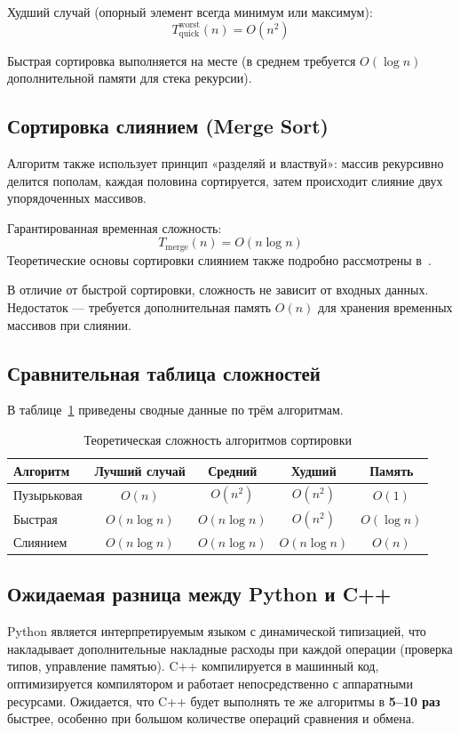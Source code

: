 Худший случай (опорный элемент всегда минимум или максимум):
\begin{equation}
    \label{eq:quick_worst}
    T_{\text{quick}}^{\text{worst}}(n) = O(n^2)
\end{equation}

Быстрая сортировка выполняется на месте (в среднем требуется $O(\log n)$ дополнительной памяти для стека рекурсии).

\subsection{Сортировка слиянием (Merge Sort)}

Алгоритм также использует принцип «разделяй и властвуй»: массив рекурсивно делится пополам, каждая половина сортируется, затем происходит слияние двух упорядоченных массивов.

Гарантированная временная сложность:
\begin{equation}
    \label{eq:merge}
    T_{\text{merge}}(n) = O(n \log n)
\end{equation}
Теоретические основы сортировки слиянием также подробно рассмотрены в~\cite{cormen2009}.

В отличие от быстрой сортировки, сложность не зависит от входных данных. Недостаток — требуется дополнительная память $O(n)$ для хранения временных массивов при слиянии.

\subsection{Сравнительная таблица сложностей}

В таблице~\ref{tab:complexity} приведены сводные данные по трём алгоритмам.

\begin{table}[H]
\centering
\caption{Теоретическая сложность алгоритмов сортировки}
\label{tab:complexity}
\begin{tabular}{|l|c|c|c|c|}
\hline
\textbf{Алгоритм} & \textbf{Лучший случай} & \textbf{Средний} & \textbf{Худший} & \textbf{Память} \\
\hline
Пузырьковая & $O(n)$ & $O(n^2)$ & $O(n^2)$ & $O(1)$ \\
\hline
Быстрая & $O(n \log n)$ & $O(n \log n)$ & $O(n^2)$ & $O(\log n)$ \\
\hline
Слиянием & $O(n \log n)$ & $O(n \log n)$ & $O(n \log n)$ & $O(n)$ \\
\hline
\end{tabular}
\end{table}

\subsection{Ожидаемая разница между Python и C++}

Python является интерпретируемым языком с динамической типизацией, что накладывает дополнительные накладные расходы при каждой операции (проверка типов, управление памятью). C++ компилируется в машинный код, оптимизируется компилятором и работает непосредственно с аппаратными ресурсами. Ожидается, что C++ будет выполнять те же алгоритмы в \textbf{5–10 раз} быстрее, особенно при большом количестве операций сравнения и обмена.